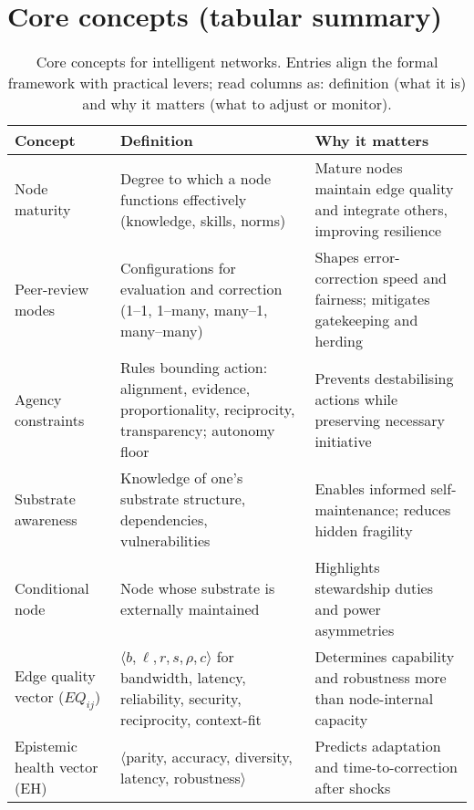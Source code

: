 \documentclass[12pt]{article}
\newcommand{\EH}{\ensuremath{\mathrm{EH}}}
\begin{document}
\section{Core concepts (tabular summary)}\label{sec:concepts}
\begin{table}[htbp]
\centering
\small
\caption{Core concepts for intelligent networks. Entries align the formal framework with practical levers; read columns as: definition (what it is) and why it matters (what to adjust or monitor).}
\label{tab:concepts}
\begin{tabularx}{\linewidth}{lYY}
\toprule
\textbf{Concept} & \textbf{Definition} & \textbf{Why it matters} \\
\midrule
Node maturity & Degree to which a node functions effectively (knowledge, skills, norms) & Mature nodes maintain edge quality and integrate others, improving resilience \\
Peer-review modes & Configurations for evaluation and correction (1--1, 1--many, many--1, many--many) & Shapes error-correction speed and fairness; mitigates gatekeeping and herding \\
Agency constraints & Rules bounding action: alignment, evidence, proportionality, reciprocity, transparency; autonomy floor & Prevents destabilising actions while preserving necessary initiative \\
Substrate awareness & Knowledge of one's substrate structure, dependencies, vulnerabilities & Enables informed self-maintenance; reduces hidden fragility \\
Conditional node & Node whose substrate is externally maintained & Highlights stewardship duties and power asymmetries \\
Edge quality vector ($EQ_{ij}$) & $\langle b,\ell,r,s,\rho,c\rangle$ for bandwidth, latency, reliability, security, reciprocity, context-fit & Determines capability and robustness more than node-internal capacity \\
Epistemic health vector ($\EH$) & $\langle$parity, accuracy, diversity, latency, robustness$\rangle$ & Predicts adaptation and time-to-correction after shocks \\
\bottomrule
\end{tabularx}
\end{table}
\end{document}
